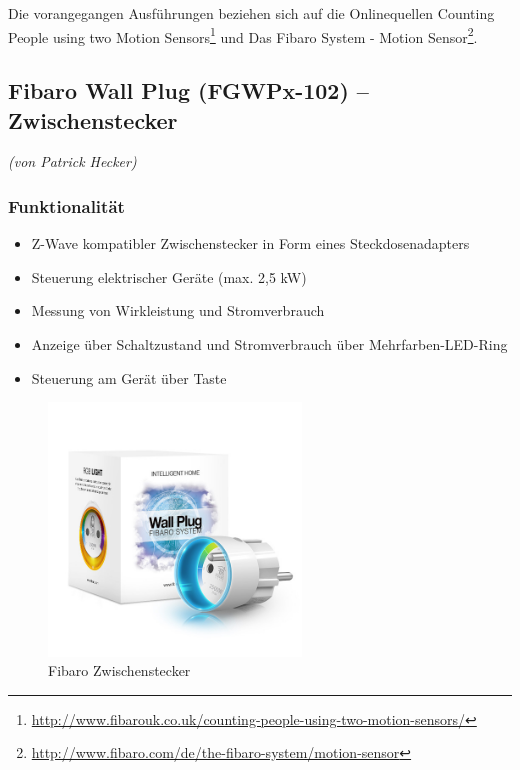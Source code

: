 \noindent
Die vorangegangen Ausführungen beziehen sich auf die Onlinequellen \glqq Counting People using two Motion Sensors\grqq\footnote{\url{http://www.fibarouk.co.uk/counting-people-using-two-motion-sensors/}} und \glqq Das Fibaro System - Motion Sensor\grqq\footnote{\url{http://www.fibaro.com/de/the-fibaro-system/motion-sensor}}. 

\newpage
\subsection{Fibaro Wall Plug (FGWPx-102) – Zwischenstecker}
\label{subsec:fibaroWallPlug}

\emph{(von Patrick Hecker)}
\subsubsection{Funktionalität}
\begin{itemize}
	\item Z-Wave kompatibler Zwischenstecker in Form eines Steckdosenadapters
	\item Steuerung elektrischer Geräte (max. 2,5 kW)
	\item Messung von Wirkleistung und Stromverbrauch
	\item Anzeige über Schaltzustand und Stromverbrauch über Mehrfarben-LED-Ring
	\item Steuerung am Gerät über Taste
\end{itemize}

\begin{figure}[h!]
	\centering
	\includegraphics[width=0.6\textwidth]{img/Sensorevaluation/FibaroWallPlug.jpg}
	\caption{Fibaro Zwischenstecker}
	\label{fig:sensorenFibaroWallPlug}
\end{figure}

